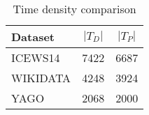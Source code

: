 \begin{table}[htb]
\centering
\begin{minipage}{0.95\columnwidth}
\centering
\caption{Time density comparison}
\vspace{-3mm}

\begin{tabular}{l|cc}\hline
Dataset  & $|T_D|$ & $|T_P|$ \\ \hline
ICEWS14  & 7422    & 6687    \\
WIKIDATA & 4248    & 3924    \\
YAGO     & 2068    & 2000    \\\hline
\end{tabular}

\label{tab:time_density_testset_stats}
\end{minipage}
\end{table}

